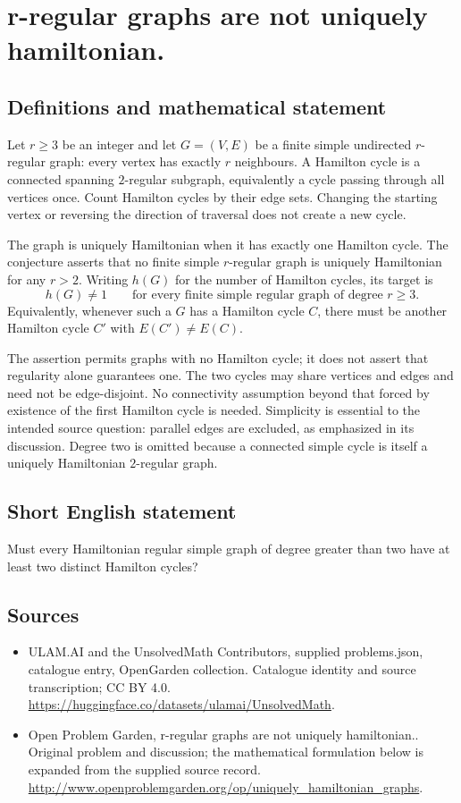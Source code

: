 \documentclass[11pt,a4paper]{article}
\begin{document}
\section*{r-regular graphs are not uniquely hamiltonian.}\label{statement}

\subsection{Definitions and mathematical statement}
Let $r\geq3$ be an integer and let $G=(V,E)$ be a finite simple
undirected $r$-regular graph: every vertex has exactly $r$
neighbours. A Hamilton cycle is a connected spanning
$2$-regular subgraph, equivalently a cycle passing through
all vertices once. Count Hamilton cycles by their edge sets.
Changing the starting vertex or reversing the direction of
traversal does not create a new cycle.

The graph is uniquely Hamiltonian when it has exactly one
Hamilton cycle. The conjecture asserts that no finite simple
$r$-regular graph is uniquely Hamiltonian for any $r>2$.
Writing $h(G)$ for the number of Hamilton cycles, its target
is
\[
 h(G)\neq1\qquad
 \text{for every finite simple regular graph of degree }r\geq3.
\]
Equivalently, whenever such a $G$ has a Hamilton cycle $C$,
there must be another Hamilton cycle $C'$ with
$E(C')\neq E(C)$.

The assertion permits graphs with no Hamilton cycle; it
does not assert that regularity alone guarantees one. The
two cycles may share vertices and edges and need not be
edge-disjoint. No connectivity assumption beyond that
forced by existence of the first Hamilton cycle is needed.
Simplicity is essential to the intended source question:
parallel edges are excluded, as emphasized in its discussion.
Degree two is omitted because a connected simple cycle is
itself a uniquely Hamiltonian $2$-regular graph.
\subsection{Short English statement}
Must every Hamiltonian regular simple graph of degree greater than two have at least two distinct Hamilton cycles?
\subsection{Sources}
\begin{itemize}
\item[S1] ULAM.AI and the UnsolvedMath Contributors, supplied problems.json, catalogue entry, OpenGarden collection. Catalogue identity and source transcription; CC BY 4.0.
\url{https://huggingface.co/datasets/ulamai/UnsolvedMath}.
\item[S2] Open Problem Garden, r-regular graphs are not uniquely hamiltonian.. Original problem and discussion; the mathematical formulation below is expanded from the supplied source record.
\url{http://www.openproblemgarden.org/op/uniquely_hamiltonian_graphs}.
\end{itemize}
\end{document}
